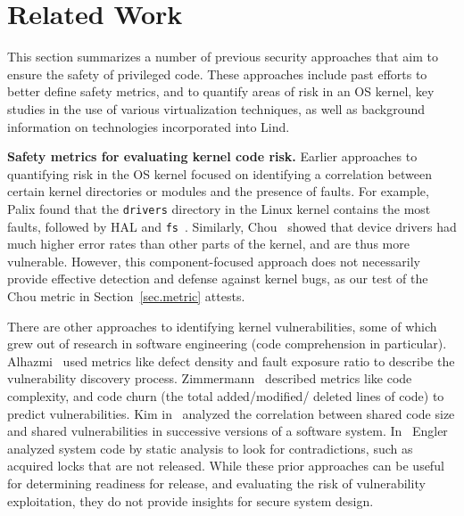 \section{Related Work}
\label{sec.related_work}

This section summarizes a number of previous security approaches
that aim to ensure the safety of privileged code. %
These approaches include past efforts to better define safety metrics, and to quantify
areas of risk in an OS kernel, key studies in the use of various virtualization
 techniques, as well as background information on technologies incorporated into
 Lind.

\textbf{Safety metrics for evaluating kernel code risk.}
Earlier approaches to quantifying risk
in the OS kernel focused on identifying a correlation between certain
kernel directories or modules and the presence of faults. For example,
Palix found that the \texttt{drivers} directory in the Linux kernel contains the
most faults, followed by HAL and \texttt{fs}~\cite{palix2011faults}. Similarly,
Chou~\cite{PittSFIeld} showed that device drivers had
much higher error rates than other parts of the kernel, and are thus more vulnerable.
However, this component-focused approach does not necessarily
provide effective detection and defense against kernel bugs, as our
test of the Chou metric in Section~\ref{sec.metric} attests.

There are other approaches to identifying kernel vulnerabilities, some of
which grew out of research in software engineering (code comprehension
in particular). Alhazmi~\cite{alhazmi2008application}
used metrics like defect density and fault exposure ratio to describe the
vulnerability discovery process. Zimmermann~\cite{zimmermann2010searching}
described metrics like code complexity, and code churn (the total added/modified/
deleted lines of code) to predict vulnerabilities. Kim in~\cite{kim2007vulnerability} analyzed
the correlation between shared code size and shared vulnerabilities in
successive versions of a software system. In~\cite{engler2001bugs} Engler analyzed 
system code by static analysis to look for contradictions, such as acquired locks that are
not released. While
these prior approaches can be useful for determining readiness for release, and
evaluating the risk of vulnerability exploitation,
they do not provide insights for secure system design.

